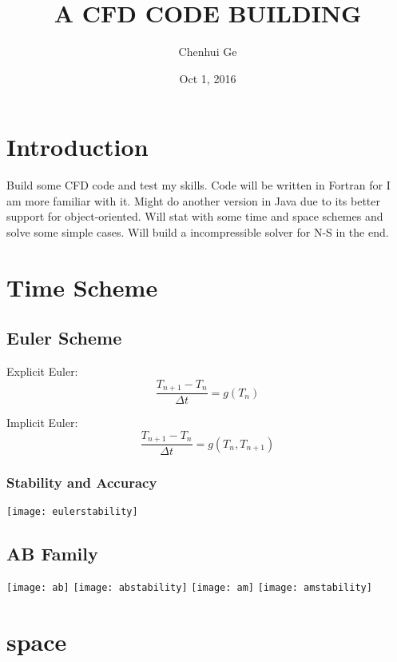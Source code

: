 \documentclass{article}
\title{A CFD CODE BUILDING}
\author{Chenhui Ge}
\date{Oct 1, 2016}
\begin{document}
\maketitle

\newpage

\section{Introduction}
Build some CFD code and test my skills. Code will be written in Fortran for I am more familiar with it. Might do another version in Java due to its better support for object-oriented.
Will stat with some time and space schemes and solve some simple cases. Will build a incompressible solver for N-S in the end.

\section{Time Scheme}
\subsection{Euler Scheme}
Explicit Euler:
\begin{equation}
\frac{T_{n+1}-T_{n}}{\Delta t}=g(T_n)
\end{equation}


Implicit Euler:
\begin{equation}
\frac{T_{n+1}-T_{n}}{\Delta t}=g(T_n,T_{n+1})
\end{equation}
\subsubsection{Stability and Accuracy}
\texttt{[image: eulerstability]}
\subsection{AB Family}
\centering
\texttt{[image: ab]}
\centering
\texttt{[image: abstability]}
\texttt{[image: am]}
\texttt{[image: amstability]}

\section{space}
\end{document}
